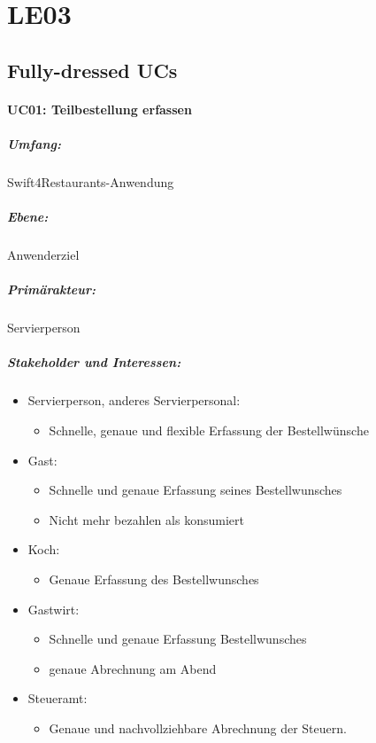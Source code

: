 \documentclass{article}
\begin{document}
\section{LE03}


\subsection{Fully-dressed UCs
}

\paragraph{UC01: Teilbestellung erfassen\\}

\subparagraph{Umfang: } Swift4Restaurants-Anwendung
\subparagraph{Ebene: } Anwenderziel
\subparagraph{Primärakteur: } Servierperson
\subparagraph{Stakeholder und Interessen:\\}
\begin{itemize}
	\item Servierperson, anderes Servierpersonal:
	\begin{itemize}
		\item Schnelle, genaue und flexible Erfassung der Bestellwünsche
	\end{itemize}
	\item Gast:
	\begin{itemize}
		\item Schnelle und genaue Erfassung seines Bestellwunsches
		\item Nicht mehr bezahlen als konsumiert
	\end{itemize}
	\item Koch:
	\begin{itemize}
		\item Genaue Erfassung des Bestellwunsches
	\end{itemize}
	\item Gastwirt:
	\begin{itemize}
		\item Schnelle und genaue Erfassung Bestellwunsches
		\item genaue Abrechnung am Abend
	\end{itemize}
	\item Steueramt:
	\begin{itemize}
		\item Genaue und nachvollziehbare Abrechnung der Steuern.
	\end{itemize}
	
\end{itemize}
\end{document}
